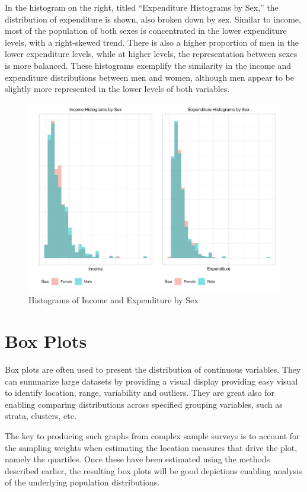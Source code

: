 \documentclass[
  12pt,
]{book}
\begin{document}
In the histogram on the right, titled ``Expenditure Histograms by Sex,'' the distribution of expenditure is shown, also broken down by sex. Similar to income, most of the population of both sexes is concentrated in the lower expenditure levels, with a right-skewed trend. There is also a higher proportion of men in the lower expenditure levels, while at higher levels, the representation between sexes is more balanced. These histograms exemplify the similarity in the income and expenditure distributions between men and women, although men appear to be slightly more represented in the lower levels of both variables.

\begin{figure}
\includegraphics[width=33.33in]{www/05_graficas/02_Hist_sex} \caption{Histograms of Income and Expenditure by Sex}\label{fig:HistIncomeExpenditureSex}
\end{figure}

\section{Box Plots}\label{box-plots}

Box plots are often used to present the distribution of continuous variables. They can summarize large datasets by providing a visual display providing easy visual to identify location, range, variability and outliers. They are great also for enabling comparing distributions across specified grouping variables, such as strata, clusters, etc.

The key to producing such graphs from complex sample surveys is to account for the sampling weights when estimating the location measures that drive the plot, namely the quartiles. Once these have been estimated using the methods described earlier, the resulting box plots will be good depictions enabling analysis of the underlying population distributions.
\end{document}
